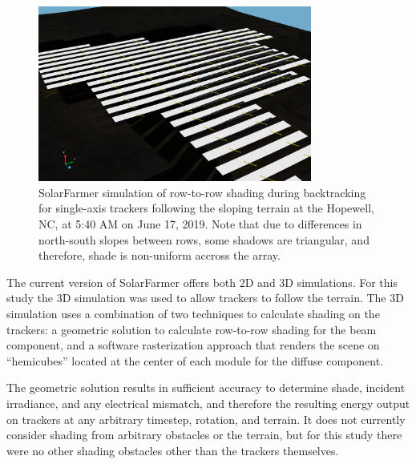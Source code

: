 \documentclass[conference]{IEEEtran}
\begin{document}
\begin{figure}[htbp]
\centerline{\includegraphics[width=9cm]{Hopewell-Friends-SolarFarmer-shade-follows-std.png}}
\caption{SolarFarmer simulation of row-to-row shading during backtracking for single-axis trackers following the sloping terrain at the Hopewell, NC, at 5:40 AM on June 17, 2019. Note that due to differences in north-south slopes between rows, some shadows are triangular, and therefore, shade is non-uniform accross the array.}
\label{terrain-shade}
\end{figure}

The current version of SolarFarmer offers both 2D and 3D simulations. For this study the 3D simulation was used to allow trackers to follow the terrain. The 3D simulation uses a combination of two techniques to calculate shading on the trackers: a geometric solution to calculate row-to-row shading for the beam component, and a software rasterization approach that renders the scene on “hemicubes” located at the center of each module for the diffuse component. 

The geometric solution results in sufficient accuracy to determine shade, incident irradiance, and any electrical mismatch, and therefore the resulting energy output on trackers at any arbitrary timestep, rotation, and terrain. It does not currently consider shading from arbitrary obstacles or the terrain, but for this study there were no other shading obstacles other than the trackers themselves.
\end{document}
